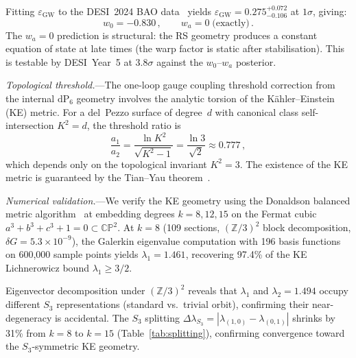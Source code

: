 \documentclass[aps,prl,twocolumn,superscriptaddress]{revtex4-2}
\newcommand{\epsGW}{\varepsilon_{\mathrm{GW}}}
\newcommand{\dP}{\mathrm{dP}_6}
\begin{document}
Fitting $\epsGW$ to the DESI~2024 BAO data~\cite{DESI2024} yields
$\epsGW = 0.275^{+0.072}_{-0.106}$ at $1\sigma$, giving:
\begin{equation}
  \boxed{w_0 = -0.830\,,\qquad w_a = 0 \;\text{(exactly)}\,.}
  \label{eq:w0-prediction}
\end{equation}
The $w_a = 0$ prediction is structural: the RS geometry produces a
constant equation of state at late times (the warp factor is static after
stabilisation).  This is testable by DESI~Year~5 at $3.8\sigma$ against the
$w_0$--$w_a$ posterior.



\textit{Topological threshold.}---The one-loop gauge coupling
threshold correction from the internal $\dP$ geometry involves the analytic
torsion of the K\"ahler--Einstein (KE) metric.  For a del~Pezzo surface of
degree~$d$ with canonical class self-intersection $K^2 = d$, the threshold
ratio is
\begin{equation}
  \frac{a_1}{a_2} = \frac{\ln K^2}{\sqrt{K^2 - 1}}
  = \frac{\ln 3}{\sqrt{2}} \approx 0.777\,,
  \label{eq:threshold}
\end{equation}
which depends only on the topological invariant $K^2 = 3$.  The existence of
the KE metric is guaranteed by the Tian--Yau theorem~\cite{TianYau1987}.

\textit{Numerical validation.}---We verify the KE geometry
using the Donaldson balanced metric algorithm~\cite{Donaldson2005} at embedding
degrees $k = 8, 12, 15$ on the Fermat cubic
$a^3 + b^3 + c^3 + 1 = 0 \subset \mathbb{CP}^2$.  At $k = 8$ (109 sections,
$(\mathbb{Z}/3)^2$ block decomposition, $\delta G = 5.3 \times 10^{-9}$), the
Galerkin eigenvalue computation with 196 basis functions on 600{,}000 sample
points yields $\lambda_1 = 1.461$, recovering 97.4\% of the KE Lichnerowicz
bound $\lambda_1 \geq 3/2$.

Eigenvector decomposition under $(\mathbb{Z}/3)^2$ reveals that $\lambda_1$
and $\lambda_2 = 1.494$ occupy different $S_3$ representations (standard
vs.\ trivial orbit), confirming their near-degeneracy is accidental.  The
$S_3$ splitting $\Delta\lambda_{S_3} = |\lambda_{(1,0)} - \lambda_{(0,1)}|$
shrinks by 31\% from $k = 8$ to $k = 15$ (Table~\ref{tab:splitting}),
confirming convergence toward the $S_3$-symmetric KE geometry.
\end{document}
